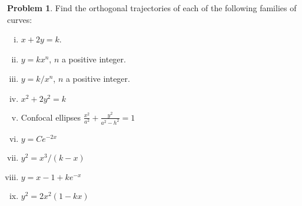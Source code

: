 \documentclass{scrartcl}
\theoremstyle{definition}
\newtheorem{problem}{Problem}
\begin{document}
\begin{problem}
Find the orthogonal trajectories of each of the following families of curves:
\begin{multicols}{2}
\begin{enumerate}[(i)]
	\item $x+2y=k$.
	\item $y=kx^n$, $n$ a positive integer.
	\item $y=k/x^n$, $n$ a positive integer.
	\item $x^2+2y^2=k$
	\item Confocal ellipses $\tfrac{x^2}{a^2}+\tfrac{y^2}{a^2-h^2}=1$
	\item $y=Ce^{-2x}$
	\item $y^2 = x^3/(k-x)$
	\item $y=x-1+ke^{-x}$
	\item $y^2 = 2x^2(1-kx)$
\end{enumerate}
\end{multicols}
\end{problem}
\end{document}
